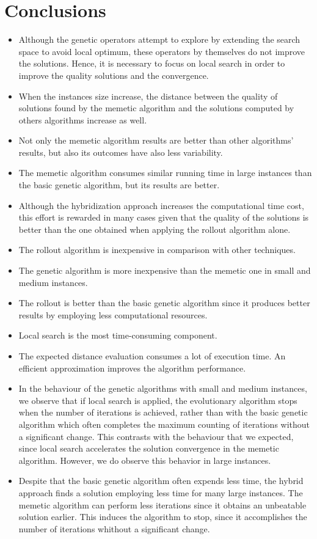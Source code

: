 \chapter{Conclusions}
\label{chap:conclusions}


\begin{itemize}
 \item Although the genetic operators attempt to explore by extending the search space to avoid local optimum, these operators by themselves do not improve the solutions. Hence, it is necessary to focus on local search in order to improve the quality solutions and the convergence.
 \item When the instances size increase, the distance between the quality of solutions found by the memetic algorithm and the solutions computed by others algorithms increase as well.
 \item Not only the memetic algorithm results are better than other algorithms' results, but also its outcomes have also less variability.
 \item The memetic algorithm consumes similar running time in large instances than the basic genetic algorithm, but its results are better.
 \item Although the hybridization approach increases the computational time cost, this effort is rewarded in many cases given that the quality of the solutions is better than the one obtained when applying the rollout algorithm alone. 
 \item The rollout algorithm is inexpensive in comparison with other techniques.
 \item The genetic algorithm is more inexpensive than the memetic one in small and medium instances.
 \item The rollout is better than the basic genetic algorithm since it produces better results by employing less computational resources.
 \item Local search is the most time-consuming component.
 \item The expected distance evaluation consumes a lot of execution time. An efficient approximation improves the algorithm performance.
 \item In the behaviour of the genetic algorithms with small and medium instances, we observe that if local search is applied, the evolutionary algorithm stops when the number of iterations is achieved, rather than with the basic genetic algorithm which often completes the maximum counting of iterations without a significant change. This contrasts with the behaviour that we expected, since local search accelerates the solution convergence in the memetic algorithm. However, we do observe this behavior in large instances.
 \item Despite that the basic genetic algorithm often expends less time, the hybrid approach finds a solution employing less time for many large instances. The memetic algorithm can perform less iterations since it obtains an unbeatable solution earlier. This induces the algorithm to stop, since it accomplishes the number of iterations whithout a significant change.
 
\end{itemize}
